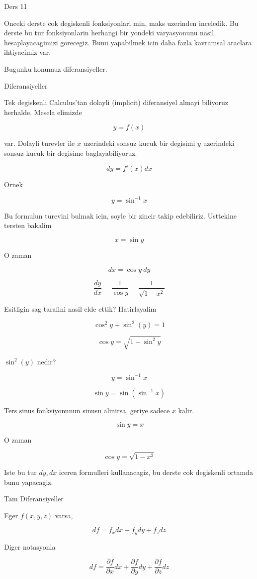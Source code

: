 \documentclass[12pt,fleqn]{article}\usepackage{../common}
\begin{document}
Ders 11

Onceki derste cok degiskenli fonksiyonlari min, maks uzerinden
inceledik. Bu derste bu tur fonksiyonlarin herhangi bir yondeki
varyasyonunu nasil hesaplayacagimizi gorecegiz. Bunu yapabilmek icin daha
fazla kavramsal araclara ihtiyacimiz var. 

Bugunku konumuz diferansiyeller. 

Diferansiyeller

Tek degiskenli Calculus'tan dolayli (implicit) diferansiyel almayi
biliyoruz herhalde. Mesela elimizde

\[ y = f(x) \]

var. Dolayli turevler ile $x$ uzerindeki sonsuz kucuk bir degisimi $y$
uzerindeki sonsuz kucuk bir degisime baglayabiliyoruz. 

\[ dy = f'(x) dx \]

Ornek

\[ y = \sin^{-1} x \]

Bu formulun turevini bulmak icin, soyle bir zincir takip
edebiliriz. Usttekine tersten bakalim

\[ x = \sin y \]

O zaman

\[ dx = \cos y \ dy \]

\[ 
\frac{dy}{dx} = \frac{1}{\cos y} = \frac{1}{\sqrt{1-x^2}}
 \]

Esitligin sag tarafini nasil elde ettik? Hatirlayalim

\[ \cos^2 y + \sin^2(y) = 1 \]

\[ \cos y = \sqrt{1 - \sin^2y} \]

$\sin^2(y)$ nedir? 

\[ y = \sin^{-1} x \]

\[ \sin y = \sin(\sin^{-1}x) \]

Ters sinus fonksiyonunun sinusu alinirsa, geriye sadece $x$ kalir. 

\[ \sin y = x \]

O zaman

\[ \cos y = \sqrt{1 - x^2} \]

Iste bu tur $dy,dx$ iceren formulleri kullanacagiz, bu derste cok
degiskenli ortamda bunu yapacagiz. 

Tam Diferansiyeller

Eger $f(x,y,z)$ varsa, 

\[ df = f_xdx + f_ydy + f_zdz \]

Diger notasyonla

\[ df = \frac{\partial f}{\partial x}dx + \frac{\partial f}{\partial y}dy + 
\frac{\partial f}{\partial z}dz \]
\end{document}

